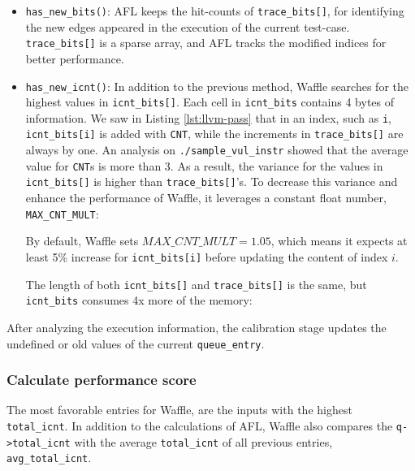 \begin{itemize}
    \item \texttt{has\_new\_bits()}: AFL keeps the hit-counts of \texttt{trace\_bits[]}, for identifying the new edges appeared in the execution of the current test-case. \texttt{trace\_bits[]} is a sparse array, and AFL tracks the modified indices for better performance.
    \item \texttt{has\_new\_icnt()}: In addition to the previous method, Waffle searches for the highest values in \texttt{icnt\_bits[]}. Each cell in \texttt{icnt\_bits} contains 4 bytes of information. We saw in Listing \ref{lst:llvm-pass} that in an index, such as \texttt{i}, \texttt{icnt\_bits[i]} is added with \texttt{CNT}, while the increments in \texttt{trace\_bits[]} are always by one. An analysis on \texttt{./sample\_vul\_instr} showed that the average value for \texttt{CNT}s is more than 3. As a result, the variance for the values in \texttt{icnt\_bits[]} is higher than \texttt{trace\_bits[]}'s. To decrease this variance and enhance the performance of Waffle, it leverages a constant float number, \texttt{MAX\_CNT\_MULT}:
    
    

    By default, Waffle sets $MAX\_CNT\_MULT=1.05$, which means it expects at least 5\% increase for \texttt{icnt\_bits[i]} before updating the content of index $i$.

    The length of both \texttt{icnt\_bits[]} and \texttt{trace\_bits[]} is the same, but \texttt{icnt\_bits} consumes 4x more of the memory:
    
\end{itemize}

After analyzing the execution information, the calibration stage updates the undefined or old values of the current \texttt{queue\_entry}.

\subsubsection*{Calculate performance score}

The most favorable entries for Waffle, are the inputs with the highest \texttt{total\_icnt}. In addition to the calculations of AFL, Waffle also compares the \texttt{q->total\_icnt} with the average \texttt{total\_icnt} of all previous entries, \texttt{avg\_total\_icnt}.

